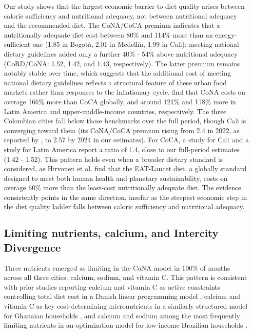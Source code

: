 \documentclass[Afour, sageh,times]{sagej}
\begin{document}
Our study shows that the largest economic barrier to diet quality arises between caloric sufficiency and nutritional adequacy, not between nutritional adequacy and the recommended diet. The CoNA/CoCA premium indicates that a nutritionally adequate diet cost between 80\% and 114\% more than an energy-sufficient one (1.85 in Bogotá, 2.01 in Medellín, 1.99 in Cali); meeting national dietary guidelines added only a further 40\% - 54\% above nutritional adequacy (CoRD/CoNA: 1.52, 1.42, and 1.43, respectively). The latter premium remains notably stable over time, which suggests that the additional cost of meeting national dietary guidelines reflects a structural feature of these urban food markets rather than responses to the inflationary cycle. \citet{Bai2020} find that CoNA costs on average 166\% more than CoCA globally, and around 121\% and 118\% more in Latin America and upper-middle-income countries, respectively. The three Colombian cities fall below those benchmarks over the full period, though Cali is converging toward them (its CoNA/CoCA premium rising from 2.4 in 2022, as reported by \citealt{Yoshioka2026}, to 2.57 by 2024 in our estimates). For CoCA, a study for Cali \citet{Yoshioka2026} and a study for Latin America \citet{FAO2021SOFI} report a ratio of 1.4, close to our full-period estimates (1.42 - 1.52). This pattern holds even when a broader dietary standard is considered, as Hirvonen et al. \cite{Hirvonen2020} find that the EAT-Lancet diet, a globally standard designed to meet both human health and planetary sustainability, costs on average 60\% more than the least-cost nutritionally adequate diet. The evidence consistently points in the same direction, insofar as the steepest economic step in the diet quality ladder falls between caloric sufficiency and nutritional adequacy.


\subsection{Limiting nutrients, calcium, and Intercity Divergence}

Three nutrients emerged as limiting in the CoNA model in 100\% of months across all three cities: calcium, sodium, and vitamin C. This pattern is consistent with prior studies reporting calcium and vitamin C as active constraints controlling total diet cost in a Danish linear programming model \cite{Parlesak2016}, calcium and vitamin C as key cost-determining micronutrients in a similarly structured model for Ghanaian households \cite{Nykanen2018}, and calcium and sodium among the most frequently limiting nutrients in an optimization model for low-income Brazilian households \cite{Verly2019}.
\end{document}
